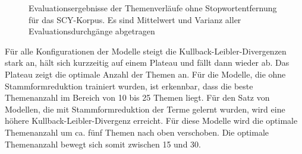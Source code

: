 \begin{figure}
\caption{Evaluationsergebnisse der Themenverläufe ohne Stopwortentfernung für das SCY-Korpus. Es sind Mittelwert und Varianz aller Evaluationsdurchgänge abgetragen}
\label{fig:topicModelEvaluationNoStop}
\end{figure}

Für alle Konfigurationen der Modelle steigt die Kullback-Leibler-Divergenzen stark an, hält sich kurzzeitig auf einem Plateau und fällt dann wieder ab. Das Plateau zeigt die optimale Anzahl der Themen an. Für die Modelle, die ohne Stammformreduktion trainiert wurden, ist erkennbar, dass die beste Themenanzahl im Bereich von 10 bis 25 Themen liegt. Für den Satz von Modellen, die mit Stammformreduktion der Terme gelernt wurden, wird eine höhere Kullback-Leibler-Divergenz erreicht. Für diese Modelle wird die optimale Themenanzahl um ca. fünf Themen nach oben verschoben. Die optimale Themenanzahl bewegt sich somit zwischen 15 und 30.

